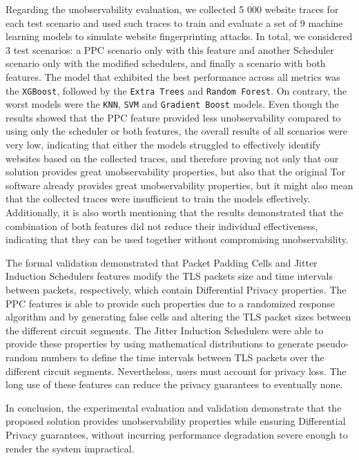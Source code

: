 Regarding the unobservability evaluation, we collected 5 000 website traces for each test scenario and used such traces to train and evaluate a set of 9 machine learning models to simulate website fingerprinting attacks. In total, we considered 3 test scenarios: a PPC scenario only with this feature and another Scheduler scenario only with the modified schedulers, and finally a scenario with both features. The model that exhibited the best performance across all metrics was the \texttt{XGBoost}, followed by the \texttt{Extra Trees} and \texttt{Random Forest}. On contrary, the worst models were the \texttt{KNN}, \texttt{SVM} and \texttt{Gradient Boost} models. Even though the results showed that the PPC feature provided less unobservability compared to using only the scheduler or both features, the overall results of all scenarios were very low, indicating that either the models struggled to effectively identify websites based on the collected traces, and therefore proving not only that our solution provides great unobservability properties, but also that the original Tor software already provides great unobservability properties, but it might also mean that the collected traces were insufficient to train the models effectively. Additionally, it is also worth mentioning that the results demonstrated that the combination of both features did not reduce their individual effectiveness, indicating that they can be used together without compromising unobservability.

The formal validation demonstrated that Packet Padding Cells and Jitter Induction Schedulers features modify the TLS packets size and time intervals between packets, respectively, which contain Differential Privacy properties. The PPC features is able to provide such properties due to a randomized response algorithm and by generating false cells and altering the TLS packet sizes between the different circuit segments. The Jitter Induction Schedulers were able to provide these properties by using mathematical distributions to generate pseudo-random numbers to define the time intervals between TLS packets over the different circuit segments. Nevertheless, users must account for privacy loss. The long use of these features can reduce the privacy guarantees to eventually none.

In conclusion, the experimental evaluation and validation demonstrate that the proposed solution provides unobservability properties while ensuring Differential Privacy guarantees, without incurring performance degradation severe enough to render the system impractical.

